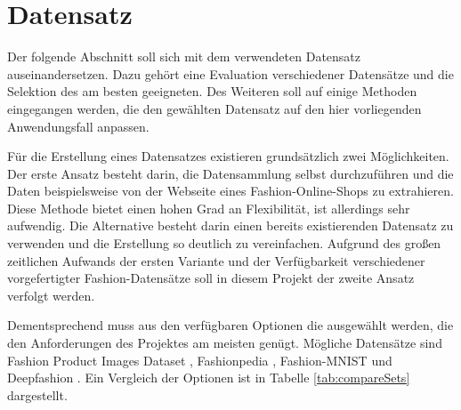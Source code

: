 \section{Datensatz} \label{sec:data_set}

Der folgende Abschnitt soll sich mit dem verwendeten Datensatz auseinandersetzen. Dazu gehört eine Evaluation verschiedener Datensätze und die Selektion des am besten geeigneten. Des Weiteren soll auf einige Methoden eingegangen werden, die den gewählten Datensatz auf den hier vorliegenden Anwendungsfall anpassen.

Für die Erstellung eines Datensatzes existieren grundsätzlich zwei Möglichkeiten. Der erste Ansatz besteht darin, die Datensammlung selbst durchzuführen und die Daten beispielsweise von der Webseite eines Fashion-Online-Shops zu extrahieren. Diese Methode bietet einen hohen Grad an Flexibilität, ist allerdings sehr aufwendig. Die Alternative besteht darin einen bereits existierenden Datensatz zu verwenden und die Erstellung so deutlich zu vereinfachen. Aufgrund des großen zeitlichen Aufwands der ersten Variante und der Verfügbarkeit verschiedener vorgefertigter Fashion-Datensätze soll in diesem Projekt der zweite Ansatz verfolgt werden.

Dementsprechend muss aus den verfügbaren Optionen die ausgewählt werden, die den Anforderungen des Projektes am meisten genügt. Mögliche Datensätze sind Fashion Product Images Dataset \cite{FashionProduct2019}, Fashionpedia \cite{Fashionpedia2020}, Fashion-MNIST \cite{FashionMNIST2017} und Deepfashion \cite{DeepFashion2016}. Ein Vergleich der Optionen ist in Tabelle \ref{tab:compareSets} dargestellt. 


